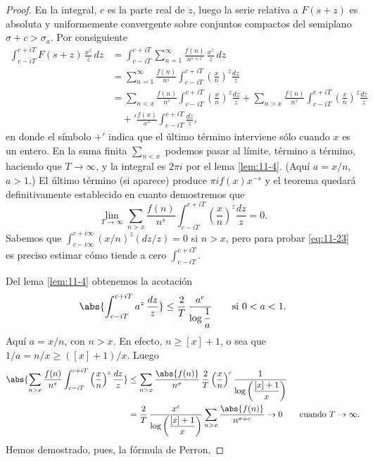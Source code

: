 \documentclass[12pt,a4paper]{book}
\begin{document}
    \begin{proof}
        En la integral, $c$ es la parte real de $z$, luego la serie relativa a $F(s+z)$ es
        absoluta y uniformemente convergente sobre conjuntos compactos del semiplano
        $\sigma+c>\sigma_{a}$. Por consiguiente
        \begin{align*}
            \int_{c-iT}^{c+iT}F(s+z)\,\frac{x^{z}}{z}\,dz&=\int_{c-iT}^{c+iT}\sum_{n=1}^{\infty}\frac{f(n)}{n^{s+z}}\,\frac{x^{z}}{z}\,dz\\
            &=\sum_{n=1}^{\infty}\frac{f(n)}{n^{s}}\int_{c-iT}^{c+iT}\left(\frac{x}{n}\right)^{z}\frac{dz}{z}\\
            &=\sum_{n<x}\frac{f(n)}{n^{s}}\int_{c-iT}^{c+iT}\left(\frac{x}{n}\right)^{z}\frac{dz}{z}+\sum_{n>x}\frac{f(n)}{n^{s}}\int_{c-iT}^{c+iT}\left(\frac{x}{n}\right)^{z}\frac{dz}{z}\\
            &\quad+{}'\frac{f(x)}{x^{s}}\int_{c-iT}^{c+iT}\frac{dz}{z},
        \end{align*}
        en donde el símbolo $+'$ indica que el último término interviene sólo cuando $x$ es un
        entero. En la suma finita $\sum_{n<x}$ podemos pasar al límite, término a término,
        haciendo que $T\to\infty$, y la integral es $2\pi i$ por el lema \ref{lem:11-4}.
        (Aquí $a=x/n$, $a>1$.) El último término (si aparece) produce $\pi if(x)x^{-s}$ y el
        teorema quedará definitivamente establecido en cuanto demostremos que
        \begin{equation}\label{eq:11-23}
            \lim_{T\to\infty}\sum_{n>x}\frac{f(n)}{n^{s}}\int_{c-iT}^{c+iT}\left(\frac{x}{n}\right)^{z}\frac{dz}{z}=0.
        \end{equation}
        Sabemos que $\int_{c-i\infty}^{c+i\infty}(x/n)^{z}(dz/z)=0$ si $n>x$, pero para probar
        \eqref{eq:11-23} es preciso estimar cómo tiende a cero $\int_{c-iT}^{c+iT}$.

        Del lema \ref{lem:11-4} obtenemos la acotación
        \begin{equation*}
            \abs{\int_{c-iT}^{c+iT}a^{z}\,\frac{dz}{z}}\leq\frac{2}{T}\,\frac{a^{c}}{\log\dfrac{1}{a}}\qquad\text{si }0<a<1.
        \end{equation*}
        Aquí $a=x/n$, con $n>x$. En efecto, $n\geq[x]+1$, o sea que
        $1/a=n/x\geq([x]+1)/x$. Luego
        \begin{align*}
            \abs{\sum_{n>x}\frac{f(n)}{n^{s}}\int_{c-iT}^{c+iT}\left(\frac{x}{n}\right)^{z}\frac{dz}{z}}&\leq\sum_{n>x}\frac{\abs{f(n)}}{n^{\sigma}}\,\frac{2}{T}\left(\frac{x}{n}\right)^{c}\frac{1}{\log\left(\dfrac{[x]+1}{x}\right)}\\
            &=\frac{2}{T}\,\frac{x^{c}}{\log\left(\dfrac{[x]+1}{x}\right)}\sum_{n>x}\frac{\abs{f(n)}}{n^{\sigma+c}}\to0\qquad\text{cuando }T\to\infty.
        \end{align*}
        Hemos demostrado, pues, la fórmula de Perron.
    \end{proof}
\end{document}
